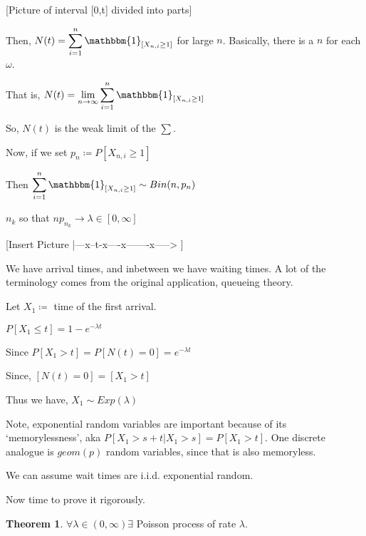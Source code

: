 \documentclass{article}
\theoremstyle{definition}
\newtheorem{theorem}{Theorem}
\begin{document}
[Picture of interval [0,t]  divided into parts]

Then, \(N(t) = \displaystyle \sum_{i=1}^{n} \mathbbm{1}_{[X_{n,i}\geq 1]} \) for large \(n\). Basically, there is a \(n\) for each \(\omega\).

That is, \(N(t)=\displaystyle \lim_{n \to \infty} \sum_{i=1}^{n} \mathbbm{1}_{[X_{n,i}\geq 1]} \) 

So, \(N(t)\) is the weak limit of the \(\sum\).

Now, if we set \(p_n \coloneqq P[X_{n,i}\geq 1]\)

Then \(\displaystyle \sum_{i=1}^{n} \mathbbm{1}_{[X_{n,i}\geq 1]} \sim Bin(n,p_n)\) 

\(n_k\) so that \(np_{n_k} \to \lambda \in [0,\infty]\) 

[Insert Picture |---x--t-x----x-------x-----> ]

We have arrival times, and inbetween we have waiting times. A lot of the terminology comes from the original application, queueing theory.

Let \(X_1 \coloneqq \) time of the first arrival.

\(P[X_1 \leq t]=1-e^{-\lambda t}\)

Since \(P[X_1 > t]=P[N(t)=0]=e^{-\lambda t}\) 

Since, \([N(t)=0]=[X_1>t]\) 

Thus we have, \(X_1 \sim Exp(\lambda)\) 

Note, exponential random variables are important because of its `memorylessness', aka \(P[X_1 > s+t | X_1 > s]=P[X_1 > t]\). One discrete analogue is \(geom(p)\) random variables, since that is also memoryless.

We can assume wait times are i.i.d. exponential random.

Now time to prove it rigorously.

\begin{theorem}
    \(\forall \lambda \in (0,\infty ) \exists \) Poisson process of rate \(\lambda\).  
\end{theorem}
\end{document}
